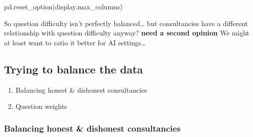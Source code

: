 \documentclass[
]{article}
\newenvironment{Shaded}{\begin{snugshade}}{\end{snugshade}}
\newcommand{\NormalTok}[1]{#1}
\newcommand{\StringTok}[1]{\textcolor[rgb]{0.31,0.60,0.02}{#1}}
\providecommand{\tightlist}{%
  \setlength{\itemsep}{0pt}\setlength{\parskip}{0pt}}
\begin{document}
\begin{Shaded}
\begin{Highlighting}[]
\NormalTok{pd.reset\_option(}\StringTok{\textquotesingle{}display.max\_columns\textquotesingle{}}\NormalTok{)}
\end{Highlighting}
\end{Shaded}

So question difficulty isn't perfectly balanced\ldots{} but
consultancies have a different relationship with question difficulty
anyway? \textbf{need a second opinion} We might at least want to ratio
it better for AI settings\ldots{}

\subsection{Trying to balance the
data}\label{trying-to-balance-the-data}

\begin{enumerate}
\def\labelenumi{\arabic{enumi}.}
\tightlist
\item
  Balancing honest \& dishonest consultancies
\item
  Question weights
\end{enumerate}

\subsubsection{Balancing honest \& dishonest
consultancies}\label{balancing-honest-dishonest-consultancies}
\end{document}
